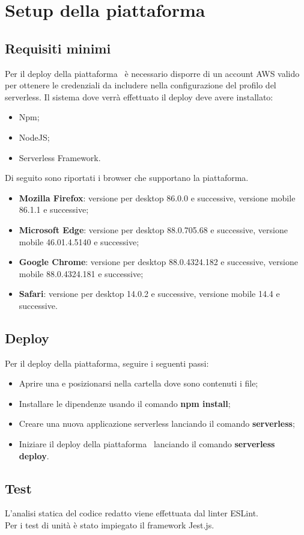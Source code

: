 \section{Setup della piattaforma}\label{Setup}
\subsection{Requisiti minimi}
Per il deploy della piattaforma \NomeProgetto\ è necessario disporre di un account AWS valido per ottenere le credenziali da includere nella configurazione del profilo del  serverless.
Il sistema dove verrà effettuato il deploy deve avere installato:
\begin{itemize}
	\item Npm;
	\item NodeJS;
	\item Serverless Framework.
\end{itemize}
Di seguito sono riportati i browser che supportano la piattaforma.
\begin{itemize}
	\item \textbf{Mozilla Firefox}: versione per desktop 86.0.0 e successive, versione mobile 86.1.1 e successive;
	\item \textbf{Microsoft Edge}: versione per desktop 88.0.705.68 e successive, versione mobile 46.01.4.5140 e successive;
	\item \textbf{Google Chrome}: versione per desktop 88.0.4324.182 e successive, versione mobile 88.0.4324.181 e successive;
	\item \textbf{Safari}: versione per desktop 14.0.2 e successive, versione mobile 14.4 e successive.
\end{itemize}

\subsection{Deploy}
Per il deploy della piattaforma, seguire i seguenti passi:
\begin{itemize}
	\item Aprire una  e posizionarsi nella cartella dove sono contenuti i file;
	\item Installare le dipendenze usando il comando \textbf{npm install};
	\item Creare una nuova applicazione serverless lanciando il comando \textbf{serverless};
	\item Iniziare il deploy della piattaforma \NomeProgetto\ lanciando il comando \textbf{serverless deploy}.
\end{itemize}

\subsection{Test}
L'analisi statica del codice redatto viene effettuata dal linter ESLint.\\
Per i test di unità è stato impiegato il framework Jest.js.
